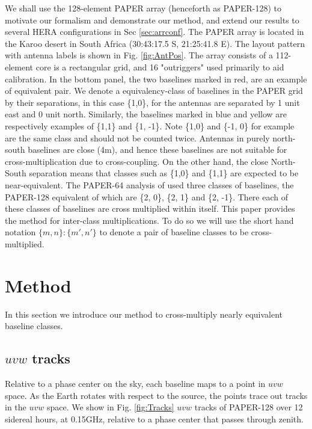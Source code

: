 \documentclass[twocolumn,apj,numberedappendix]{emulateapj}
\renewcommand\[{\begin{equation}}
\renewcommand\]{\end{equation}}
\begin{document}
We shall use the 128-element PAPER array (henceforth as PAPER-128) to motivate our formalism and demonstrate our method, and extend our results to several HERA configurations in Sec \ref{sec:arrconf}. 
The PAPER array is located in the Karoo desert in South Africa (30:43:17.5
S, 21:25:41.8 E). The layout pattern with antenna labels is shown
in Fig. \ref{fig:AntPos}. The array consists of a 112-element core is a rectangular grid, and 16 "outriggers" used primarily to aid calibration.  In the bottom panel, the two baselines marked in red, are an example of equivalent pair. We denote a equivalency-class of baselines in the PAPER grid by their separations, in this case  \{1,0\}, for the
antennas are separated by 1 unit east and 0 unit north. Similarly,
the baselines marked in blue and yellow are respectively examples
of \{1,1\} and \{1, -1\}.
Note \{1,0\} and \{-1, 0\} for example are the same class and should
not be counted twice. Antennas in purely north-south baselines
are close (4m), and hence these baselines are not suitable
for cross-multiplication due to cross-coupling. On the other hand, the close North-South separation means that classes such as \{1,0\} and  \{1,1\} are expected to be near-equivalent. The PAPER-64 analysis of \cite{Ali2015} used three classes of baselines, the PAPER-128
equivalent of which are 
\{2, 0\}, \{2, 1\} and \{2, -1\}. There each of these classes
of baselines are cross multiplied within itself. This paper provides the method for inter-class multiplications. To do so we will use the short hand notation $\{m,n\}:\{m',n'\}$ to denote a pair of baseline classes to be cross-multiplied. 


\section{Method \label{sec:method}}\label{sec:method}

In this section we introduce our method to cross-multiply nearly equivalent baseline classes. 

\subsection{$uvw$ tracks \label{sec:tracks}}



Relative to a phase center on the sky, each baseline maps to a point in $uvw$ space. As the Earth rotates with respect to
the source, the points trace out tracks in the $uvw$ space. 
We show in Fig. \ref{fig:Tracks} $uvw$ tracks of PAPER-128 over 12 sidereal hours, at 0.15GHz, relative to a phase center that passes through zenith. 
\end{document}
